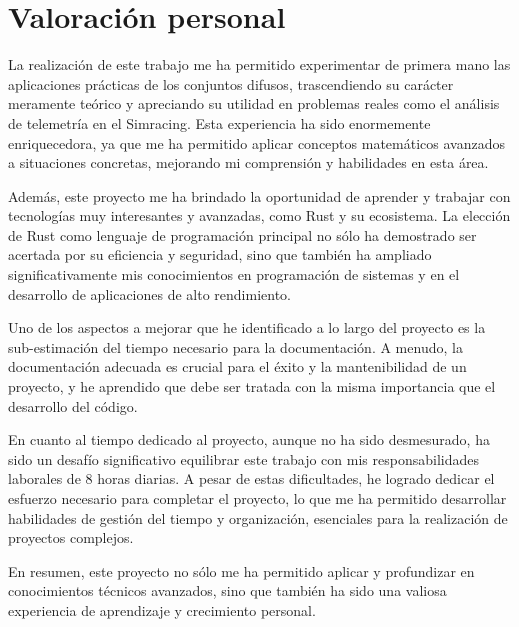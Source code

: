 \section{Valoración personal}

La realización de este trabajo me ha permitido experimentar de primera mano las aplicaciones prácticas de los conjuntos difusos, trascendiendo su carácter meramente teórico y apreciando su utilidad en problemas reales como el análisis de telemetría en el Simracing. Esta experiencia ha sido enormemente enriquecedora, ya que me ha permitido aplicar conceptos matemáticos avanzados a situaciones concretas, mejorando mi comprensión y habilidades en esta área.

Además, este proyecto me ha brindado la oportunidad de aprender y trabajar con tecnologías muy interesantes y avanzadas, como Rust y su ecosistema. La elección de Rust como lenguaje de programación principal no sólo ha demostrado ser acertada por su eficiencia y seguridad, sino que también ha ampliado significativamente mis conocimientos en programación de sistemas y en el desarrollo de aplicaciones de alto rendimiento.

Uno de los aspectos a mejorar que he identificado a lo largo del proyecto es la sub-estimación del tiempo necesario para la documentación. A menudo, la documentación adecuada es crucial para el éxito y la mantenibilidad de un proyecto, y he aprendido que debe ser tratada con la misma importancia que el desarrollo del código.

En cuanto al tiempo dedicado al proyecto, aunque no ha sido desmesurado, ha sido un desafío significativo equilibrar este trabajo con mis responsabilidades laborales de 8 horas diarias. A pesar de estas dificultades, he logrado dedicar el esfuerzo necesario para completar el proyecto, lo que me ha permitido desarrollar habilidades de gestión del tiempo y organización, esenciales para la realización de proyectos complejos.

En resumen, este proyecto no sólo me ha permitido aplicar y profundizar en conocimientos técnicos avanzados, sino que también ha sido una valiosa experiencia de aprendizaje y crecimiento personal.








